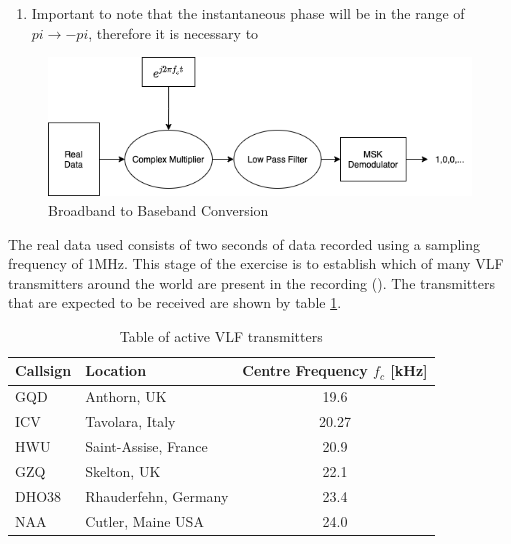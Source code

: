 \begin{enumerate}
\begin{subequations}
\begin{multicols}{2}
                
                \begin{equation}
                    \phi = \omega t = 2\pi f
                    \label{eq:omega}
                \end{equation}
                \begin{equation}
                    \frac{d}{dt}\phi = \omega
                    \label{eq:instfeq}
                \end{equation}
                \end{multicols}
                \label{eq:instphase}
            \end{subequations}
            \item Important to note that the instantaneous phase will be in the range of $pi \rightarrow -pi$, therefore it is necessary to
        \end{enumerate}


\begin{figure}[h!]
    \centering
    \includegraphics[width = \textwidth]{figs/method/downconversion.png}
    \caption{Broadband to Baseband Conversion}
    \label{fig:downconversion}
\end{figure}

The real data used consists of two seconds of data recorded using a sampling frequency of 1\si{\mega\hertz}. This stage of the exercise is to establish which of many VLF transmitters around the world are present in the recording (\cite{wikipediaVLF}). The transmitters that are expected to be received are shown by table \ref{tab:vlftransmitters}.

\begin{table}[h!]
\centering
\begin{tabular}{l|l|c}
\textbf{Callsign} & \textbf{Location}    & \textbf{Centre Frequency $f_c$ [kHz]} \\
\hline 
GQD               & Anthorn, UK          & 19.6                            \\
ICV             & Tavolara, Italy & 20.27 \\
HWU               & Saint-Assise, France & 20.9                            \\
GZQ               & Skelton, UK          & 22.1                            \\
DHO38             & Rhauderfehn, Germany & 23.4                            \\
NAA               & Cutler, Maine USA    & 24.0                             
\end{tabular}
\caption{Table of active VLF transmitters}
\label{tab:vlftransmitters}
\end{table}

